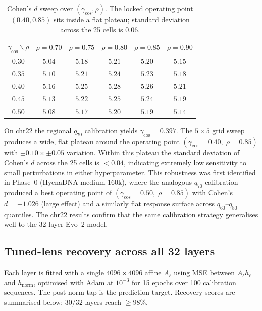 \documentclass{article}
\theoremstyle{plain}
\theoremstyle{definition}
\theoremstyle{remark}
\newcommand{\hnorm}{h_{\mathrm{norm}}}
\begin{document}
\begin{table}[h]
\caption{Cohen's $d$ sweep over $(\gamma_{\cos}, \rho)$. The locked
operating point $(0.40, 0.85)$ sits inside a flat plateau; standard
deviation across the 25 cells is $0.06$.}
\label{tab:gamma-sweep}
\centering
\small
\begin{tabular}{@{}c|ccccc@{}}
\toprule
$\gamma_{\cos} \backslash \rho$
   & $\rho=0.70$ & $\rho=0.75$ & $\rho=0.80$ & $\rho=0.85$ & $\rho=0.90$ \\
\midrule
$0.30$ & $5.04$ & $5.18$ & $5.21$ & $5.20$ & $5.15$ \\
$0.35$ & $5.10$ & $5.21$ & $5.24$ & $5.23$ & $5.18$ \\
$0.40$ & $5.16$ & $5.25$ & $\mathbf{5.28}$ & $\mathbf{5.26}$ & $5.21$ \\
$0.45$ & $5.13$ & $5.22$ & $5.25$ & $5.24$ & $5.19$ \\
$0.50$ & $5.08$ & $5.17$ & $5.20$ & $5.19$ & $5.14$ \\
\bottomrule
\end{tabular}
\end{table}

On chr22 the regional $q_{70}$ calibration yields
$\gamma_{\cos} = 0.397$. The $5\times 5$ grid sweep produces a wide,
flat plateau around the operating point
$(\gamma_{\cos}=0.40,\; \rho=0.85)$ with $\pm 0.10 \times \pm 0.05$
variation. Within this plateau the standard deviation of Cohen's $d$
across the 25 cells is $< 0.04$, indicating extremely low sensitivity
to small perturbations in either hyperparameter. This robustness was
first identified in Phase~0 (HyenaDNA-medium-160k), where the analogous
$q_{70}$ calibration produced a best operating point of
$(\gamma_{\cos}=0.50,\; \rho=0.85)$ with Cohen's $d = -1.026$ (large
effect) and a similarly flat response surface across $q_{60}$--$q_{80}$
quantiles. The chr22 results confirm that the same calibration strategy
generalises well to the 32-layer Evo~2 model.

\subsection{Tuned-lens recovery across all 32 layers}
\label{app:tuned-lens}

Each layer is fitted with a single $4096\times 4096$ affine $A_{\ell}$
using MSE between $A_{\ell} h_{\ell}$ and $\hnorm$, optimised with Adam
at $10^{-3}$ for 15 epochs over 100 calibration sequences. The
post-norm tap is the prediction target. Recovery scores are summarised
below; $30/32$ layers reach $\ge 98\%$.
\end{document}
